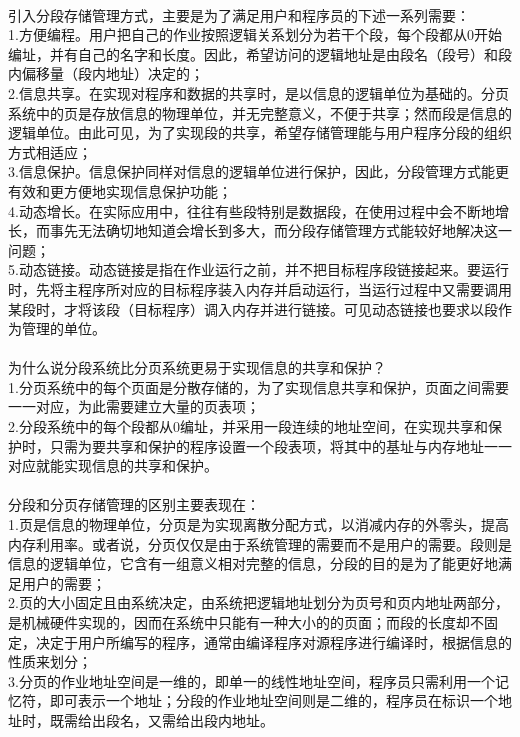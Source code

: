 \documentclass[UTF8]{article}
\begin{document}
    \\
    引入分段存储管理方式，主要是为了满足用户和程序员的下述一系列需要：\\
    1.方便编程。用户把自己的作业按照逻辑关系划分为若干个段，每个段都从0开始编址，并有自己的名字和长度。因此，希望访问的逻辑地址是由段名（段号）和段内偏移量（段内地址）决定的；\\
    2.信息共享。在实现对程序和数据的共享时，是以信息的逻辑单位为基础的。分页系统中的页是存放信息的物理单位，并无完整意义，不便于共享；然而段是信息的逻辑单位。由此可见，为了实现段的共享，希望存储管理能与用户程序分段的组织方式相适应；\\
    3.信息保护。信息保护同样对信息的逻辑单位进行保护，因此，分段管理方式能更有效和更方便地实现信息保护功能；\\
    4.动态增长。在实际应用中，往往有些段特别是数据段，在使用过程中会不断地增长，而事先无法确切地知道会增长到多大，而分段存储管理方式能较好地解决这一问题；\\
    5.动态链接。动态链接是指在作业运行之前，并不把目标程序段链接起来。要运行时，先将主程序所对应的目标程序装入内存并启动运行，当运行过程中又需要调用某段时，才将该段（目标程序）调入内存并进行链接。可见动态链接也要求以段作为管理的单位。\\
    \\
    为什么说分段系统比分页系统更易于实现信息的共享和保护？\\
    1.分页系统中的每个页面是分散存储的，为了实现信息共享和保护，页面之间需要一一对应，为此需要建立大量的页表项；\\
    2.分段系统中的每个段都从0编址，并采用一段连续的地址空间，在实现共享和保护时，只需为要共享和保护的程序设置一个段表项，将其中的基址与内存地址一一对应就能实现信息的共享和保护。\\
    \\
    分段和分页存储管理的区别主要表现在：\\
    1.页是信息的物理单位，分页是为实现离散分配方式，以消减内存的外零头，提高内存利用率。或者说，分页仅仅是由于系统管理的需要而不是用户的需要。段则是信息的逻辑单位，它含有一组意义相对完整的信息，分段的目的是为了能更好地满足用户的需要；\\
    2.页的大小固定且由系统决定，由系统把逻辑地址划分为页号和页内地址两部分，是机械硬件实现的，因而在系统中只能有一种大小的的页面；而段的长度却不固定，决定于用户所编写的程序，通常由编译程序对源程序进行编译时，根据信息的性质来划分；\\
    3.分页的作业地址空间是一维的，即单一的线性地址空间，程序员只需利用一个记忆符，即可表示一个地址；分段的作业地址空间则是二维的，程序员在标识一个地址时，既需给出段名，又需给出段内地址。\\
\end{document}
